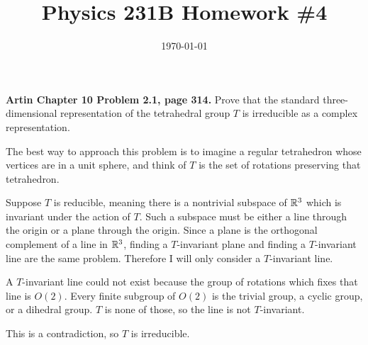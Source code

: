 \documentclass{article}
\date{\today}
\title{Physics 231B Homework \#4}
\begin{document}
\maketitle

\bigskip
\begin{prob}
    \textbf{Artin Chapter 10 Problem 2.1, page 314.} Prove that the standard three-dimensional representation of the tetrahedral group $T$ is irreducible as a complex representation.
\end{prob}
The best way to approach this problem is to imagine a regular tetrahedron whose vertices are in a unit sphere, and think of $T$ is the set of rotations preserving that tetrahedron.
\par
Suppose $T$ is reducible, meaning there is a nontrivial subspace of $\mathbb{R}^3$ which is invariant under the action of $T$. Such a subspace must be either a line through the origin or a plane through the origin. Since a plane is the orthogonal complement of a line in $\mathbb{R}^3$, finding a $T$-invariant plane and finding a $T$-invariant line are the same problem. Therefore I will only consider a $T$-invariant line.
\par
A $T$-invariant line could not exist because the group of rotations which fixes that line is $O(2)$. Every finite subgroup of $O(2)$ is the trivial group, a cyclic group, or a dihedral group. $T$ is none of those, so the line is not $T$-invariant.
\par
This is a contradiction, so $T$ is irreducible.
\end{document}
